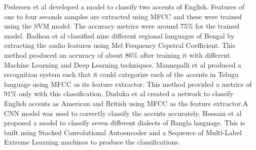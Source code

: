\documentclass[pdflatex]{sn-jnl}%
\theoremstyle{thmstyleone}%
\theoremstyle{thmstyletwo}%
\theoremstyle{thmstylethree}%
\begin{document}
Pedersen et al \cite{b16} developed a model to classify two accents of English. Features of one to four seconds samples are extracted using MFCC and these were trained using the SVM model. The accuracy metrics were around 75\% for the trained model. Badhon et al \cite{b17} classified nine different regional languages of Bengal by extracting the audio features using Mel Frequency Cepstral Coefficient. This method produced an accuracy of about 86\% after training it with different Machine Learning and Deep Learning techniques. 
Mannepalli et al \cite{b18} produced a recognition system such  that it could categorize each of the accents in Telugu language using MFCC as its feature extractor. This method provided a metrics of 91\% only with this classification. Duduka et al \cite{b19} created a network to classify English accents as American and British using MFCC as the feature extractor.A CNN model was used to correctly classify the accents accurately. Hossain et al \cite{b20} proposed a model to classify seven different dialects of Bangla language. This is built using Stacked Convolutional Autoencoder and a Sequence of Multi-Label Extreme Learning machines to produce the classifications.
\end{document}
